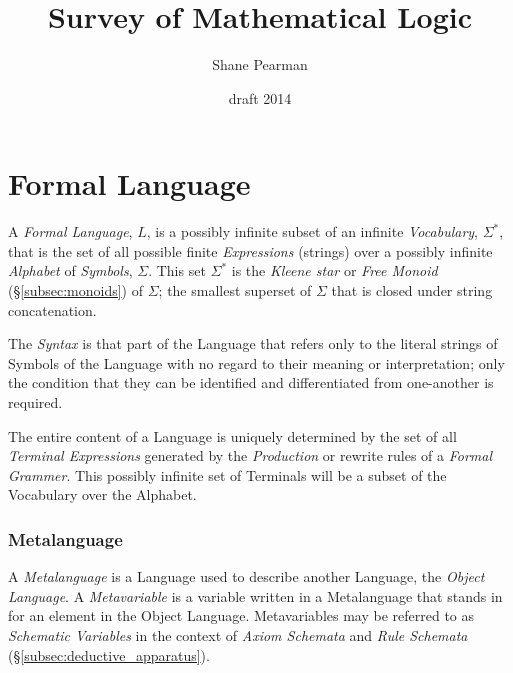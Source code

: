 \documentclass{article}
\begin{document}
\setcounter{secnumdepth}{5}
\setcounter{tocdepth}{5}


\title{Survey of Mathematical Logic}
\date{draft 2014}
\author{Shane Pearman}
\maketitle


\tableofcontents

\part{Formal Language}\label{sec:formal_language}

A \emph{Formal Language}, $L$, is a possibly infinite subset of an
infinite \emph{Vocabulary}, $\Sigma^*$, that is the set of all
possible finite \emph{Expressions} (strings) over a possibly infinite
\emph{Alphabet} of \emph{Symbols}, $\Sigma$. This set $\Sigma^*$ is
the \emph{Kleene star} or \emph{Free Monoid} (\S\ref{subsec:monoids})
of $\Sigma$; the smallest superset of $\Sigma$ that is closed under
string concatenation.

The \emph{Syntax} is that part of the Language that refers only to the
literal strings of Symbols of the Language with no regard to their
meaning or interpretation; only the condition that they can be
identified and differentiated from one-another is required.

The entire content of a Language is uniquely determined by the set of
all \emph{Terminal Expressions} generated by the \emph{Production} or
rewrite rules of a \emph{Formal Grammer}. This possibly infinite set
of Terminals will be a subset of the Vocabulary over the Alphabet.

\section{Metalanguage}\label{sec:metalanguage}

A \emph{Metalanguage} is a Language used to describe another Language,
the \emph{Object Language}. A \emph{Metavariable} is a variable
written in a Metalanguage that stands in for an element in the Object
Language. Metavariables may be referred to as \emph{Schematic
  Variables} in the context of \emph{Axiom Schemata} and \emph{Rule
  Schemata} (\S \ref{subsec:deductive_apparatus}).
\end{document}
